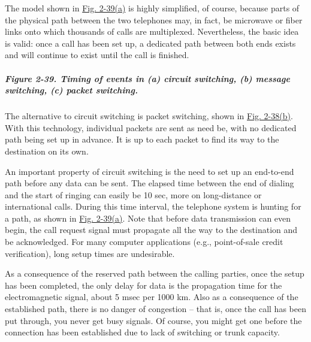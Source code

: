 The model shown in
\protect\hyperlink{0130661023_ch02lev1sec5.htmlux5cux23ch02fig39}{Fig.
2-39(a)} is highly simplified, of course, because parts of the physical
path between the two telephones may, in fact, be microwave or fiber
links onto which thousands of calls are multiplexed. Nevertheless, the
basic idea is valid: once a call has been set up, a dedicated path
between both ends exists and will continue to exist until the call is
finished.

\subparagraph[Figure 2-39. Timing of events in (a) circuit switching,
(b) message switching, (c) packet
switching.]{\texorpdfstring{\protect\hypertarget{0130661023_ch02lev1sec5.htmlux5cux23ch02fig39}{}{}Figure
2-39. Timing of events in (a) circuit switching, (b) message switching,
(c) packet
switching.}{Figure 2-39. Timing of events in (a) circuit switching, (b) message switching, (c) packet switching.}}


The alternative to circuit switching is packet switching, shown in
\protect\hyperlink{0130661023_ch02lev1sec5.htmlux5cux23ch02fig38}{Fig.
2-38(b)}. With this technology, individual packets are sent as need be,
with no dedicated path being set up in advance. It is up to each packet
to find its way to the destination on its own.

An important property of circuit switching is the need to set up an
end-to-end path {before} any data can be sent. The elapsed time between
the end of dialing and the start of ringing can easily be 10 sec, more
on long-distance or international calls. During this time interval, the
telephone system is hunting for a path, as shown in
\protect\hyperlink{0130661023_ch02lev1sec5.htmlux5cux23ch02fig39}{Fig.
2-39(a)}. Note that before data transmission can even begin, the call
request signal must propagate all the way to the destination and be
acknowledged. For many computer applications (e.g., point-of-sale credit
verification), long setup times are undesirable.

As a consequence of the reserved path between the calling parties, once
the setup has been completed, the only delay for data is the propagation
time for the electromagnetic signal, about 5 msec per 1000 km. Also as a
consequence of the established path, there is no danger of
congestion -- that is, once the call has been put through, you never get
busy signals. Of course, you might get one before the connection has
been established due to lack of switching or trunk capacity.

